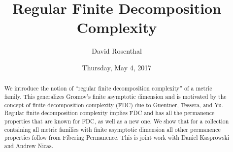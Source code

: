 \documentclass{UAmathtalk}
\author{David Rosenthal}
\title{Regular Finite Decomposition Complexity}
\date{Thursday, May 4, 2017}
\begin{document}
\maketitle

\begin{abstract}
We introduce the notion of ``regular finite decomposition complexity'' of a metric family. This generalizes Gromov's finite asymptotic dimension and is motivated by the concept of finite decomposition complexity (FDC) due to Guentner, Tessera, and Yu. Regular finite decomposition complexity implies FDC and has all the permanence properties that are known for FDC, as well as a new one. We show that for a collection containing all metric families with finite asymptotic dimension all other permanence properties follow from Fibering Permanence. This is joint work with Daniel Kasprowski and Andrew Nicas.
\end{abstract}
\end{document}
